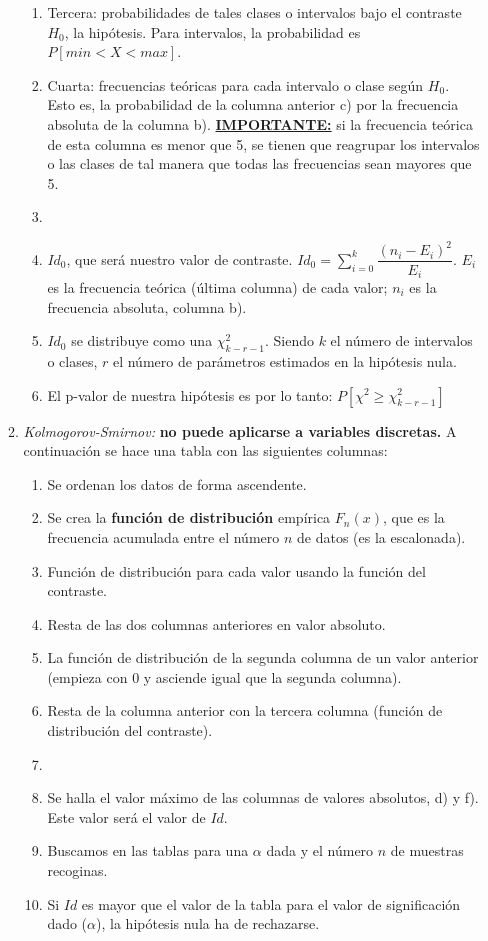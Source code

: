 \documentclass[a4paper, twocolumn, 10pt]{article}
\begin{document}
\begin{itemize}
\begin{enumerate}
\begin{enumerate}
			\item Tercera: probabilidades de tales clases o intervalos bajo el contraste $H_0$, la hipótesis. Para intervalos, la probabilidad es $P\left[min<X<max\right]$.
			\item Cuarta: frecuencias teóricas para cada intervalo o clase según $H_0$. Esto es, la probabilidad de la columna anterior c) por la frecuencia absoluta de la columna b). \textbf{\underline{IMPORTANTE:}} si la frecuencia teórica de esta columna es menor que 5, se tienen que reagrupar los intervalos o las clases de tal manera que todas las frecuencias sean mayores que 5.
			\item[] \hrulefill
			\item $Id_0$, que será nuestro valor de contraste. $Id_0 = \sum\limits_{i=0}^{k} \dfrac{\left(n_i - E_i\right)^2}{E_i}$. $E_i$ es la frecuencia teórica (última columna) de cada valor; $n_i$ es la frecuencia absoluta, columna b).
			\item $Id_0$ se distribuye como una $\chi^2_{k-r-1}$. Siendo $k$ el número de intervalos o clases, $r$ el número de parámetros estimados en la hipótesis nula.
			\item El p-valor de nuestra hipótesis es por lo tanto: $P[\chi^2\geq\chi^2_{k-r-1}]$
		\end{enumerate}
		\item \textit{Kolmogorov-Smirnov:} \textbf{no puede aplicarse a variables discretas.} A continuación se hace una tabla con las siguientes columnas:
		\begin{enumerate}
			\item Se ordenan los datos de forma ascendente.
			\item Se crea la \textbf{función de distribución} empírica $F_n(x)$, que es la frecuencia acumulada entre el número $n$ de datos (es la escalonada).
			\item Función de distribución para cada valor usando la función del contraste.
			\item Resta de las dos columnas anteriores en valor absoluto.
			\item La función de distribución de la segunda columna de un valor anterior (empieza con 0 y asciende igual que la segunda columna).
			\item Resta de la columna anterior con la tercera columna (función de distribución del contraste).
			\item[] \hrulefill
			\item Se halla el valor máximo de las columnas de valores absolutos, d) y f). Este valor será el valor de $Id$.
			\item Buscamos en las tablas para una $\alpha$ dada y el número $n$ de muestras recoginas.
			\item Si $Id$ es mayor que el valor de la tabla para el valor de significación dado ($\alpha$), la hipótesis nula ha de rechazarse.
		\end{enumerate}
	\end{enumerate}
\end{itemize}
\end{document}
